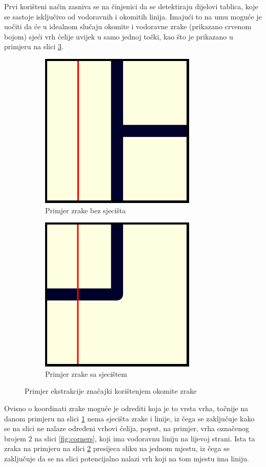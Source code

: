 \documentclass[times, utf8, zavrsni, numeric]{fer}
\begin{document}
Prvi korišteni način zasniva se na činjenici da se detektiraju dijelovi tablica, koje se sastoje isključivo od vodoravnih i okomitih linija.
Imajući to na umu moguće je uočiti da će u idealnom slučaju okomite i vodoravne zrake (prikazano crvenom bojom) sjeći vrh ćelije uvijek u samo jednoj točki, kao što je prikazano u primjeru na slici \ref{fig:lineFeatures}.

\begin{figure}[th!]
    \centering
    \begin{subfigure}{.5\textwidth}
        \centering
        \includegraphics[width=.3\linewidth]{Images/LineFeature.pdf}
        \captionsetup{justification=centering}
        \caption{Primjer zrake bez sjecišta}
        \label{fig:feature1}
    \end{subfigure}%
    \begin{subfigure}{.5\textwidth}
        \centering
        \includegraphics[width=.3\linewidth]{Images/LineFeature1.pdf}
        \captionsetup{justification=centering}
        \caption{Primjer zrake sa sjecištem}
        \label{fig:feature2}
    \end{subfigure}
    \caption{Primjer ekstrakcije značajki korištenjem okomite zrake}
    \label{fig:lineFeatures}
\end{figure}

Ovisno o koordinati zrake moguće je odrediti koja je to vrsta vrha, točnije na danom primjeru na slici \ref{fig:feature1} nema sjecišta zrake i linije, iz čega se zaključuje kako se na slici ne nalaze određeni vrhovi ćelija, poput, na primjer, vrha označenog brojem $2$ na slici \ref{fig:corners}, koji ima vodoravnu liniju na lijevoj strani.
Ista ta zraka na primjeru na slici \ref{fig:feature2} presijeca sliku na jednom mjestu, iz čega se zaključuje da se na slici potencijalno nalazi vrh koji na tom mjestu ima liniju.\\
\end{document}
